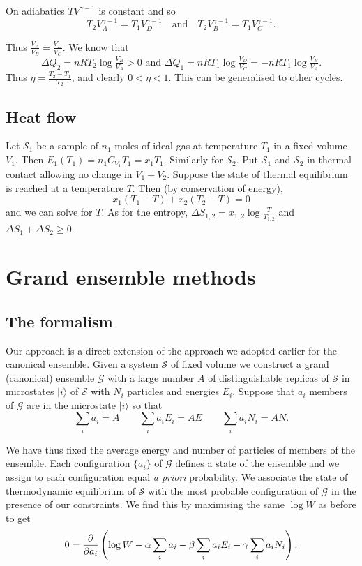 \documentclass{notes}
\newcommand{\cS}{\mathcal{S}}
\newcommand{\cG}{\mathcal{G}}
\newcommand{\ket}[1]{|#1\rangle}
\begin{document}
On adiabatics $T V^{\gamma-1}$ is constant and so
\[
T_2 V_A^{\gamma - 1} = T_1 V_D^{\gamma - 1} \quad \text{and} \quad
T_2 V_B^{\gamma - 1} = T_1 V_C^{\gamma - 1}.
\]

Thus $\tfrac{V_A}{V_B} = \tfrac{V_D}{V_C}$.  We know that
\[
\Delta Q_2 = n R T_2 \log \tfrac{V_B}{V_A} > 0 \text{ and }
\Delta Q_1 = n R T_1 \log \tfrac{V_D}{V_C} = - n R T_1 \log \tfrac{V_B}{V_A}.
\]
Thus $\eta = \tfrac{T_2 - T_1}{T_2}$, and clearly $0 < \eta < 1$.  This can
be generalised to other cycles.

\section{Heat flow}

Let $\cS_1$ be a sample of $n_1$ moles of ideal gas at temperature $T_1$
in a fixed volume $V_1$.  Then $E_1(T_1) = n_1 C_{V_1} T_1 = x_1 T_1$.
Similarly for $\cS_2$.  Put $\cS_1$ and $\cS_2$ in thermal contact allowing
no change in $V_1 + V_2$.  Suppose the state of thermal equilibrium is reached
at a temperature $T$.  Then (by conservation of energy),
\[
x_1 (T_1 - T) + x_2 (T_2 - T) = 0
\]
and we can solve for $T$.  As for the entropy,
$\Delta S_{1,2} = x_{1,2} \log \tfrac{T}{T_{1,2}}$ and
$\Delta S_1 + \Delta S_2 \ge 0$.

\chapter{Grand ensemble methods}

\section{The formalism}\label{sec:granden}

Our approach is a direct extension of the approach we adopted earlier
for the canonical ensemble.  Given a system $\cS$ of fixed volume we construct
a grand (canonical) ensemble $\cG$ with a large number $A$ of distinguishable
replicas of $\cS$ in microstates $\ket{i}$ of $\cS$ with $N_i$ particles and
energies $E_i$.  Suppose that $a_i$ members of $\cG$ are in the microstate
$\ket{i}$ so that
\[
\sum_i a_i = A \qquad \sum_i a_i E_i = A E \qquad \sum_i a_i N_i = A N. 
\]

We have thus fixed the average energy and number of particles of members of
the ensemble.  Each configuration $\{ a_i \}$ of $\cG$ defines a state
of the ensemble and we assign to each configuration equal \emph{a priori}
probability.  We associate the state of thermodynamic equilibrium of $\cS$
with the most probable configuration of $\cG$ in the presence of our
constraints.  We find this by maximising the same $\log W$ as before to
get
\[
0 = \frac{\partial }{\partial a_i} \left(\log W - \alpha \sum_i a_i - \beta \sum_i a_i E_i
- \gamma \sum_i a_i N_i \right).
\]
\end{document}
